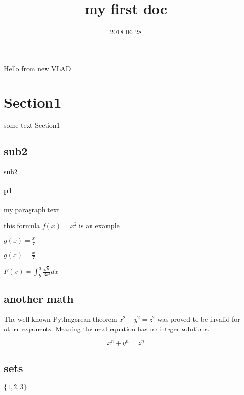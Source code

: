 \documentclass{article}
\title{my first doc}
\date{2018-06-28}
\begin{document}
        Hello from new VLAD
        \section{Section1}
        some text Section1
        \subsection{sub2}
        sub2
        \paragraph{p1}
        my paragraph text

        this formula $f(x)=x^2$ is an example
            
            $g(x)=\frac{x}{7}$

            $g(x)=\frac{x}{7}$

            $F(x)=\int^a_b \frac{\sqrt{y}}{3x^3}dx$

        \subsection{another math}
            The well known Pythagorean theorem 
            \(x^2 + y^2 = z^2\) was 
            proved to be invalid for other exponents. 
            Meaning the next equation has no integer solutions:

            \[ x^n + y^n = z^n \]
        
        \subsection{sets}   
        \(\{1,2,3\}\)

        
    
\end{document}
